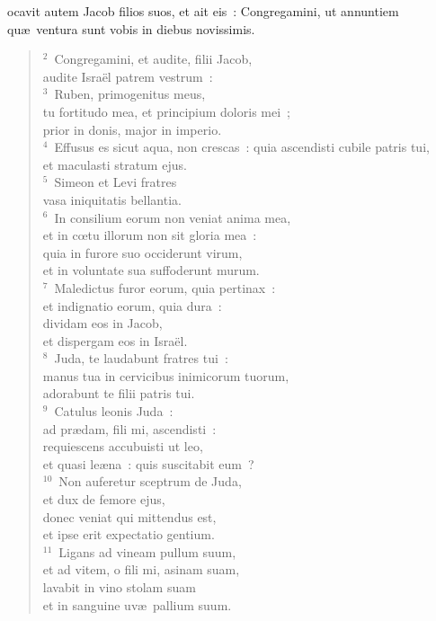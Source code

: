 \bchapter
{}ocavit autem Jacob filios suos, et ait eis~: Congregamini, ut annuntiem qu\ae\ ventura sunt vobis in diebus novissimis.
\begin{verse}\vspace{6pt}${}^{2}$~Congregamini, et audite, filii Jacob,\\ audite Isra\"el patrem vestrum~:\\
${}^{3}$~Ruben, primogenitus meus,\\ tu fortitudo mea, et principium doloris mei~;\\ prior in donis, major in imperio.\\
${}^{4}$~Effusus es sicut aqua, non crescas~: quia ascendisti cubile patris tui,\\ et maculasti stratum ejus.\\
${}^{5}$~Simeon et Levi fratres\\ vasa iniquitatis bellantia.\\
${}^{6}$~In consilium eorum non veniat anima mea,\\ et in cœtu illorum non sit gloria mea~:\\ quia in furore suo occiderunt virum,\\ et in voluntate sua suffoderunt murum.\\
${}^{7}$~Maledictus furor eorum, quia pertinax~:\\ et indignatio eorum, quia dura~:\\ dividam eos in Jacob,\\ et dispergam eos in Isra\"el.\\
${}^{8}$~Juda, te laudabunt fratres tui~:\\ manus tua in cervicibus inimicorum tuorum,\\ adorabunt te filii patris tui.\\
${}^{9}$~Catulus leonis Juda~:\\ ad pr\ae dam, fili mi, ascendisti~:\\ requiescens accubuisti ut leo,\\ et quasi le\ae na~: quis suscitabit eum~?\\
${}^{10}$~Non auferetur sceptrum de Juda,\\ et dux de femore ejus,\\ donec veniat qui mittendus est,\\ et ipse erit expectatio gentium.\\
${}^{11}$~Ligans ad vineam pullum suum,\\ et ad vitem, o fili mi, asinam suam,\\ lavabit in vino stolam suam\\ et in sanguine uv\ae\ pallium suum.\\

\end{verse}

